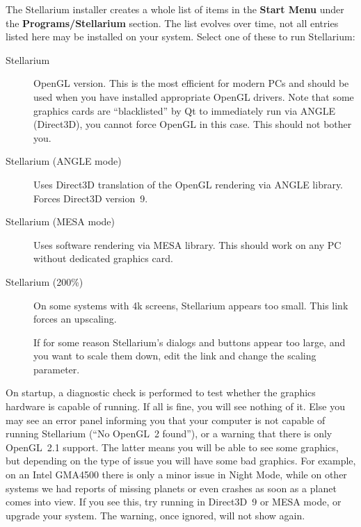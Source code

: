 The Stellarium installer creates a whole list of items in the
\textbf{Start Menu} under the \textbf{Programs/Stellarium}
section. The list evolves over time, not all entries listed here 
may be installed on your system. Select one of these to run Stellarium:
\begin{description}
\item[Stellarium] OpenGL version. This is the most efficient for
  modern PCs and should be used when you have installed appropriate
  OpenGL drivers. Note that some graphics cards are ``blacklisted'' by
  Qt to immediately run via ANGLE (Direct3D), you cannot force OpenGL in this
  case. This should not bother you.
\item[Stellarium (ANGLE mode)] Uses Direct3D translation of the OpenGL
  rendering via ANGLE library.  Forces Direct3D version~9.
\item[Stellarium (MESA mode)] Uses software rendering via MESA
  library. This should work on any PC without dedicated graphics card.
\item[Stellarium (200\%)] On some systems with 4k screens, Stellarium appears too small. 
This link forces an upscaling. 

If for some reason Stellarium's dialogs and buttons appear too large, and you want to scale them down, 
edit the link and change the scaling parameter. 
\end{description}
On startup, a diagnostic check is performed to test whether the
graphics hardware is capable of running. If all is fine, you will see
nothing of it.  Else you may see an error panel informing you that
your computer is not capable of running Stellarium (``No OpenGL~2
found''), or a warning that there is only OpenGL~2.1 support. The
latter means you will be able to see some graphics, but depending on
the type of issue you will have some bad graphics. For example, on an
Intel GMA4500 there is only a minor issue in Night Mode, while on
other systems we had reports of missing planets or even crashes as
soon as a planet comes into view. If you see this, try running in
Direct3D~9 or MESA mode, or upgrade your system. The warning, once
ignored, will not show again.

